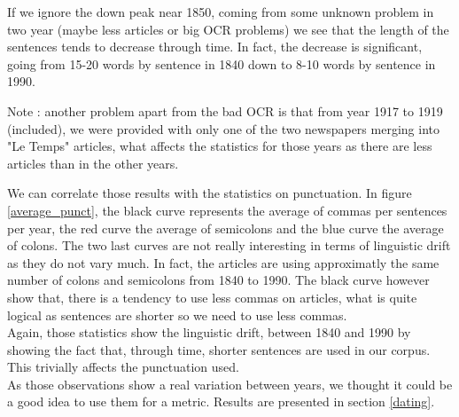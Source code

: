 If we ignore the down peak near 1850, coming from some unknown problem in two year (maybe less articles or big OCR problems) we see that the length of the sentences tends to decrease through time. In fact, the decrease is significant, going from 15-20 words by sentence in 1840 down to 8-10 words by sentence in 1990.

Note : another problem apart from the bad OCR is that from year 1917 to 1919 (included), we were provided with only one of the two newspapers merging into "Le Temps" articles, what affects the statistics for those years as there are less articles than in the other years.

We can correlate those results with the statistics on punctuation. In figure \ref{average_punct}, the black curve represents the average of commas per sentences per year, the red curve the average of semicolons and the blue curve the average of colons. The two last curves are not really interesting in terms of linguistic drift as they do not vary much. In fact, the articles are using approximatly the same number of colons and semicolons from 1840 to 1990. The black curve however show that, there is a tendency to use less commas on articles, what is quite logical as sentences are shorter so we need to use less commas.\\

Again, those statistics show the linguistic drift, between 1840 and 1990 by showing the fact that, through time, shorter sentences are used in our corpus. This trivially affects the punctuation used. \\

As those observations show a real variation between years, we thought it could be a good idea to use them for a metric. Results are presented in section \ref{dating}.
